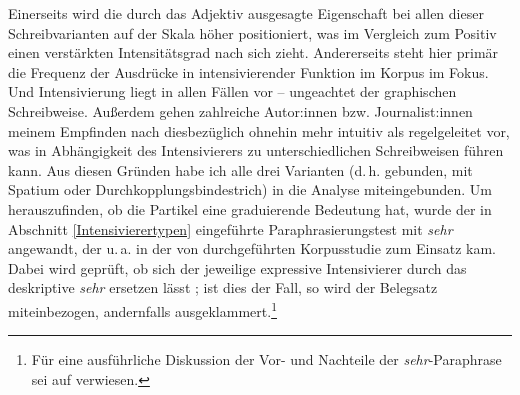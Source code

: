 {} Einerseits wird die durch das Adjektiv ausgesagte Eigenschaft bei allen dieser Schreibvarianten auf der Skala höher positioniert, was im Vergleich zum Positiv einen verstärkten Intensitätsgrad nach sich zieht. Andererseits steht hier primär die Frequenz der Ausdrücke in intensivierender Funktion im Korpus im Fokus. Und Intensivierung liegt in allen Fällen vor -- ungeachtet der graphischen Schreibweise. Außerdem gehen zahlreiche Autor:innen bzw. Journalist:innen meinem Empfinden nach diesbezüglich ohnehin mehr intuitiv als regelgeleitet vor, was in Abhängigkeit des Intensivierers zu unterschiedlichen Schreibweisen führen kann. Aus diesen Gründen habe ich alle drei Varianten (d.\,h. gebunden, mit Spatium oder Durchkopplungsbindestrich) in die Analyse miteingebunden. Um herauszufinden, ob die Partikel eine graduierende Bedeutung hat, wurde der in Abschnitt \ref{Intensivierertypen} eingeführte Paraphrasierungstest mit \textit{sehr} angewandt, der u.\,a. in der von \citet[]{Klara.2009} durchgeführten Korpusstudie zum Einsatz kam. Dabei wird geprüft, ob sich der jeweilige expressive Intensivierer durch das deskriptive \textit{sehr} ersetzen lässt \citep[vgl.][191]{Wellmann.1978}; ist dies der Fall, so wird der Belegsatz miteinbezogen, andernfalls ausgeklammert.\footnote{Für eine ausführliche Diskussion der Vor- und Nachteile der \textit{sehr}-Paraphrase sei auf \citet[]{Klara.2009} verwiesen.}

